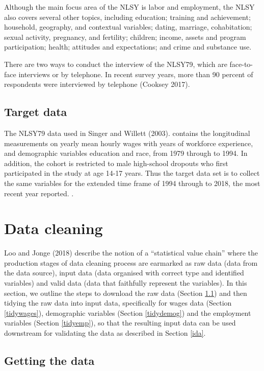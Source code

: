 \documentclass[12pt]{article}
\begin{document}
Although the main focus area of the NLSY is labor and employment, the NLSY also covers several other topics, including education; training and achievement; household, geography, and contextual variables; dating, marriage, cohabitation; sexual activity, pregnancy, and fertility; children; income, assets and program participation; health; attitudes and expectations; and crime and substance use.

There are two ways to conduct the interview of the NLSY79, which are face-to-face interviews or by telephone. In recent survey years, more than 90 percent of respondents were interviewed by telephone (Cooksey 2017).

\hypertarget{target}{%
\subsection{Target data}\label{target}}

The NLSY79 data used in Singer and Willett (2003). contains the longitudinal measurements on yearly mean hourly wages with years of workforce experience, and demographic variables education and race, from 1979 through to 1994. In addition, the cohort is restricted to male high-school dropouts who first participated in the study at age 14-17 years. Thus the target data set is to collect the same variables for the extended time frame of 1994 through to 2018, the most recent year reported. .

\hypertarget{cleaning}{%
\section{Data cleaning}\label{cleaning}}

Loo and Jonge (2018) describe the notion of a ``statistical value chain'' where the production stages of data cleaning process are earmarked as raw data (data from the data source), input data (data organised with correct type and identified variables) and valid data (data that faithfully represent the variables). In this section, we outline the steps to download the raw data (Section \ref{getdata}) and then tidying the raw data into input data, specifically for wages data (Section \ref{tidywages}), demographic variables (Section \ref{tidydemog}) and the employment variables (Section \ref{tidyemp}), so that the resulting input data can be used downstream for validating the data as described in Section \ref{ida}.

\hypertarget{getdata}{%
\subsection{Getting the data}\label{getdata}}
\end{document}
